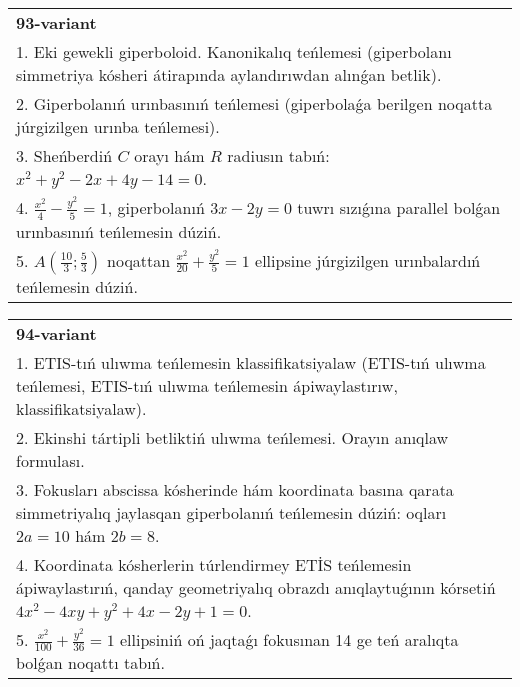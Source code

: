 \documentclass{article}
\begin{document}
\begin{tabular}{m{17cm}}
\textbf{93-variant}\\
1. Eki gewekli giperboloid. Kanonikalıq teńlemesi (giperbolanı simmetriya kósheri átirapında aylandırıwdan alınǵan betlik).\\

2. Giperbolanıń urınbasınıń teńlemesi (giperbolaǵa berilgen noqatta júrgizilgen urınba teńlemesi).\\

3. Sheńberdiń $C$ orayı hám $R$ radiusın tabıń: $x^2+y^2-2 x+4 y-14=0$.\\

4. $\frac{x^{2}}{4} - \frac{y^{2}}{5} = 1$, giperbolanıń $3x - 2y = 0$ tuwrı sızıǵına parallel bolǵan urınbasınıń teńlemesin dúziń.  \\

5. $A(\frac{10}{3};\frac{5}{3})$ noqattan $\frac{x^{2}}{20} + \frac{y^{2}}{5} = 1$ ellipsine júrgizilgen urınbalardıń teńlemesin dúziń.  
\end{tabular}
\vspace{1cm}


\begin{tabular}{m{17cm}}
\textbf{94-variant}\\
1. ETIS-tıń ulıwma teńlemesin klassifikatsiyalaw (ETIS-tıń ulıwma teńlemesi, ETIS-tıń ulıwma teńlemesin ápiwaylastırıw, klassifikatsiyalaw).\\

2. Ekinshi tártipli betliktiń ulıwma teńlemesi. Orayın anıqlaw formulası.\\

3. Fokusları abscissa kósherinde hám koordinata basına qarata simmetriyalıq jaylasqan giperbolanıń teńlemesin dúziń: oqları $2 a=10$ hám $2 b=8$.\\

4. Koordinata kósherlerin túrlendirmey ETİS teńlemesin ápiwaylastırıń, qanday geometriyalıq obrazdı anıqlaytuǵının kórsetiń $4x^{2} - 4xy + y^{2} + 4x - 2y + 1 = 0$.  \\

5. $\frac{x^{2}}{100} + \frac{y^{2}}{36} = 1$ ellipsiniń oń jaqtaǵı fokusınan 14 ge teń aralıqta bolǵan noqattı tabıń.  
\end{tabular}
\vspace{1cm}
\end{document}
